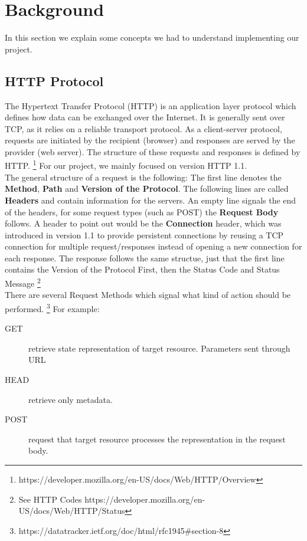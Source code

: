 \section*{Background}
In this section we explain some concepts we had to understand implementing our project. 

\subsection*{HTTP Protocol}
The Hypertext Transfer Protocol (HTTP) is an application layer protocol which defines how data can be exchanged over the Internet. It is generally sent over TCP, as it relies on a reliable transport protocol. 
As a client-server protocol, requests are initiated by the recipient (browser) and responses are served by the provider (web server). The structure of these requests and responses is defined by HTTP. \footnote{https://developer.mozilla.org/en-US/docs/Web/HTTP/Overview} For our project, we mainly focused on version HTTP 1.1. \\

The general structure of a request is the following: The first line denotes the \textbf{Method}, \textbf{Path} and \textbf{Version of the Protocol}. The following lines are called \textbf{Headers} and contain information for the servers. An empty line signals the end of the headers, for some request types (such as POST) the \textbf{Request Body} follows. A header to point out would be the \textbf{Connection} header, which was introduced in version 1.1 to provide persistent connections by reusing a TCP connection for multiple request/responses instead of opening a new connection for each response. The response follows the same structue, just that the first line contains the Version of the Protocol First, then the Status Code and Status Message \footnote{See HTTP Codes https://developer.mozilla.org/en-US/docs/Web/HTTP/Status} \\

There are several Request Methods which signal what kind of action should be performed. \footnote{https://datatracker.ietf.org/doc/html/rfc1945\#section-8} For example: 
\begin{description}
    \item[GET]retrieve state representation of target resource. Parameters sent through URL 
    \item[HEAD]retrieve only metadata. 
    \item[POST]request that target resource processes the representation in the request body. 
\end{description}

